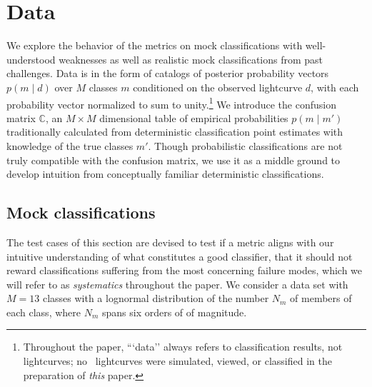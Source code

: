 \section{Data}
\label{sec:data}

We explore the behavior of the metrics on mock classifications with well-understood weaknesses as well as realistic mock classifications from past challenges.
Data is in the form of catalogs of posterior probability vectors $p(m \mid d)$ over $M$ classes $m$ conditioned on the observed lightcurve $d$, with each probability vector normalized to sum to unity.\footnote{Throughout the paper, ```data'' always refers to classification results, not lightcurves; no \plasticc\ lightcurves were simulated, viewed, or classified in the preparation of \textit{this} paper.}
We introduce the confusion matrix $\mathbb{C}$, an $M\times M$ dimensional table of empirical probabilities $p(m \mid m')$ traditionally calculated from deterministic classification point estimates with knowledge of the true classes $m'$.
Though probabilistic classifications are not truly compatible with the confusion matrix, we use it as a middle ground to develop intuition from conceptually familiar deterministic classifications.

\subsection{Mock classifications}
\label{sec:mockdata}

The test cases of this section are devised to test if a metric aligns with our intuitive understanding of what constitutes a good classifier, that it should not reward classifications suffering from the most concerning failure modes, which we will refer to as \textit{systematics} throughout the paper.
We consider a data set with $M=13$ classes
with a lognormal distribution of the number $N_{m}$ of members of each class, where $N_{m}$ spans six orders of of magnitude.

